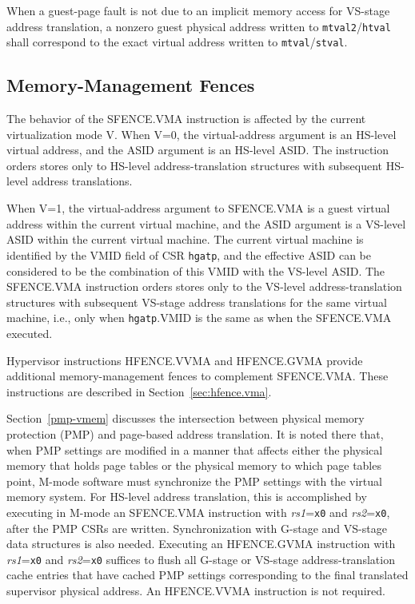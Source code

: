 When a guest-page fault is not due to an implicit
memory access for VS-stage address translation,
a nonzero guest physical address written to
{\tt mtval2}/{\tt htval} shall correspond
to the exact virtual address written to
{\tt mtval}/{\tt stval}.

\subsection{Memory-Management Fences}

The behavior of the SFENCE.VMA instruction is affected by the current
virtualization mode V.  When V=0, the virtual-address argument is an HS-level
virtual address, and the ASID argument is an HS-level ASID.
The instruction orders stores only to HS-level address-translation structures
with subsequent HS-level address translations.

When V=1, the virtual-address argument to SFENCE.VMA is a guest virtual
address within the current virtual machine, and the ASID argument is a VS-level
ASID within the current virtual machine.
The current virtual machine is identified by the VMID field of CSR {\tt hgatp},
and the effective ASID can be considered to be the combination of this VMID
with the VS-level ASID.
The SFENCE.VMA instruction orders stores only to the VS-level
address-translation structures with subsequent VS-stage address translations
for the same virtual machine, i.e., only when {\tt hgatp}.VMID is the same as
when the SFENCE.VMA executed.

Hypervisor instructions HFENCE.VVMA and HFENCE.GVMA provide additional
memory-management fences to complement SFENCE.VMA.
These instructions are described in Section~\ref{sec:hfence.vma}.

Section~\ref{pmp-vmem} discusses the intersection between physical memory
protection (PMP) and page-based address translation.
It is noted there that, when PMP settings are modified in a manner that affects
either the physical memory that holds page tables or the physical memory to
which page tables point, M-mode software must synchronize the PMP settings with
the virtual memory system.
For HS-level address translation, this is accomplished by executing in M-mode
an SFENCE.VMA instruction with {\em rs1}={\tt x0} and {\em rs2}={\tt x0}, after
the PMP CSRs are written.
Synchronization with G-stage and VS-stage data structures is also needed.
Executing an HFENCE.GVMA instruction with {\em rs1}={\tt x0} and
{\em rs2}={\tt x0} suffices to flush all G-stage or VS-stage
address-translation cache entries that have cached PMP settings
corresponding to the final translated supervisor physical address.
An HFENCE.VVMA instruction is not required.

